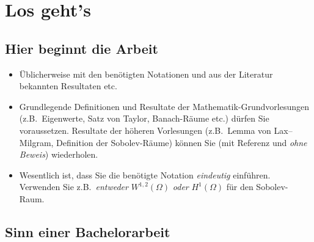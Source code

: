 \chapter{Los geht's}
\label{chapter:content}

\section{Hier beginnt die Arbeit}

{\color{change}
\begin{itemize}
\item Üblicherweise mit den benötigten Notationen und aus der Literatur bekannten Resultaten etc.
\item Grundlegende Definitionen und Resultate der Mathematik-Grundvorlesungen (z.B.\ Eigenwerte, Satz von Taylor, Banach-Räume etc.) dürfen Sie voraussetzen. Resultate der höheren Vorlesungen (z.B.\ Lemma von Lax--Milgram, Definition der Sobolev-Räume) können Sie (mit Referenz und \emph{ohne Beweis}) wiederholen.
\item Wesentlich ist, dass Sie die benötigte Notation \emph{eindeutig} einführen. Verwenden Sie z.B.\ \emph{entweder} $W^{1,2}(\Omega)$ \emph{oder} $H^1(\Omega)$ für den Sobolev-Raum.
\end{itemize}
}

\section{Sinn einer Bachelorarbeit}

